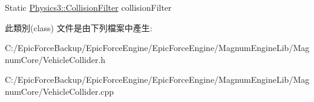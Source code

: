 Static \hyperlink{class_magnum_1_1_physics3_1_1_collision_filter}{Physics3\+::\+Collision\+Filter} collision\+Filter 

此類別(class) 文件是由下列檔案中產生\+:\begin{DoxyCompactItemize}
\item 
C\+:/\+Epic\+Force\+Backup/\+Epic\+Force\+Engine/\+Epic\+Force\+Engine/\+Magnum\+Engine\+Lib/\+Magnum\+Core/Vehicle\+Collider.\+h\item 
C\+:/\+Epic\+Force\+Backup/\+Epic\+Force\+Engine/\+Epic\+Force\+Engine/\+Magnum\+Engine\+Lib/\+Magnum\+Core/Vehicle\+Collider.\+cpp\end{DoxyCompactItemize}
